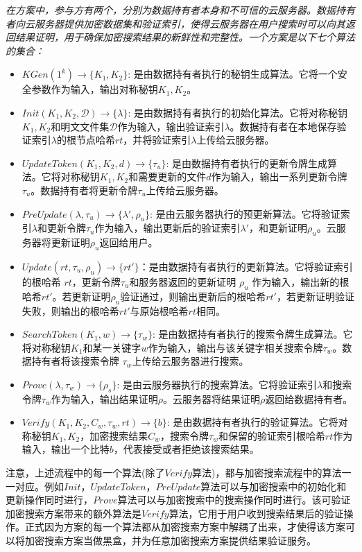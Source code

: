 \begin{definition}\label{def:single}
  {\itshape
      在\single 方案中，参与方有两个，分别为数据持有者本身和不可信的云服务器。数据持有者向云服务器提供加密数据集和验证索引，使得云服务器在用户搜索时可以向其返回结果证明，用于确保加密搜索结果的新鲜性和完整性。一个\single 方案是以下七个算法的集合：
      \begin{itemize}
        \item $KGen(1^k) \rightarrow \{K_1,K_2\}$: 是由数据持有者执行的秘钥生成算法。它将一个安全参数作为输入，输出对称秘钥$K_1,K_2$。
        \item $Init(K_1,K_2, \mathcal{D}) \rightarrow \{\lambda\}$: 是由数据持有者执行的初始化算法。它将对称秘钥$K_1,K_2$和明文文件集$\mathcal{D}$作为输入，输出验证索引$\lambda$。数据持有者在本地保存验证索引$\lambda$的根节点哈希$rt$，并将验证索引$\lambda$上传给云服务器。
        \item $UpdateToken(K_1,K_2, d) \rightarrow \{\tau_u\}$: 是由数据持有者执行的更新令牌生成算法。它将对称秘钥$K_1,K_2$和需要更新的文件$d$作为输入，输出一系列更新令牌$\tau_u$。数据持有者将更新令牌$\tau_u$上传给云服务器。
        \item $PreUpdate(\lambda, \tau_u) \rightarrow \{\lambda',\rho_u\}$: 是由云服务器执行的预更新算法。它将验证索引$\lambda$和更新令牌$\tau_u$作为输入，输出更新后的验证索引$\lambda'$，和更新证明$\rho_u$。云服务器将更新证明$\rho_u$返回给用户。
        \item $Update(rt,\tau_u,\rho_u) \rightarrow \{rt'\}$：是由数据持有者执行的更新算法。它将验证索引的根哈希 $rt$，更新令牌$\tau_u$和服务器返回的更新证明 $\rho_u$ 作为输入，输出新的根哈希$rt'$。若更新证明$\rho_u$验证通过，则输出更新后的根哈希$rt'$，若更新证明验证失败，则输出的根哈希$rt'$与原始根哈希$rt$相同。
        \item $SearchToken(K_1, w) \rightarrow \{\tau_{w}\}$: 是由数据持有者执行的搜索令牌生成算法。它将对称秘钥$K_1$和某一关键字$w$作为输入，输出与该关键字相关搜索令牌$\tau_{w}$。数据持有者将该搜索令牌 $\tau_{w}$上传给云服务器进行搜索。
        \item $Prove(\lambda, \tau_{w}) \rightarrow \{\rho_s\}$: 是由云服务器执行的搜索算法。它将验证索引$\lambda$和搜索令牌$\tau_{w}$作为输入，输出结果证明$\rho$。云服务器将结果证明$\rho$返回给数据持有者。
        \item $Verify(K_1,K_2, C_w, \tau_{w}, rt) \rightarrow \{b\}$: 是由数据持有者执行的验证算法。它将对称秘钥$K_1,K_2$，加密搜索结果$C_w$，搜索令牌$\tau_{w}$和保留的验证索引根哈希$rt$作为输入，输出一个比特$b$，代表接受或者拒绝该搜索结果。
      \end{itemize}
      }
\end{definition}
注意，上述流程中的每一个算法(除了$Verify$算法)，都与加密搜索流程中的算法一一对应。例如$Init$，$UpdateToken$，$PreUpdate$算法可以与加密搜索中的初始化和更新操作同时进行，$Prove$算法可以与加密搜索中的搜索操作同时进行。该可验证加密搜索方案带来的额外算法是$Verify$算法，它用于用户收到搜索结果后的验证操作。正式因为\single 方案的每一个算法都从加密搜索方案中解耦了出来，才使得该方案可以将加密搜索方案当做黑盒，并为任意加密搜索方案提供结果验证服务。

